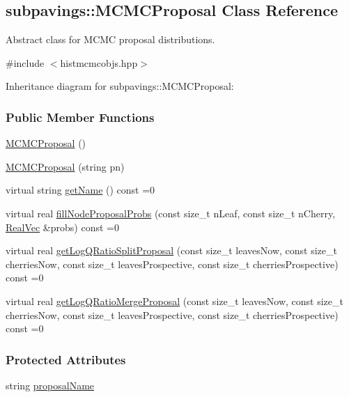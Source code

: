 \hypertarget{classsubpavings_1_1MCMCProposal}{\subsection{subpavings\-:\-:\-M\-C\-M\-C\-Proposal \-Class \-Reference}
\label{classsubpavings_1_1MCMCProposal}
}


\-Abstract class for \-M\-C\-M\-C proposal distributions.  




{\ttfamily \#include $<$histmcmcobjs.\-hpp$>$}



\-Inheritance diagram for subpavings\-:\-:\-M\-C\-M\-C\-Proposal\-:
\subsubsection*{\-Public \-Member \-Functions}
\begin{DoxyCompactItemize}
\item 
\hyperlink{classsubpavings_1_1MCMCProposal_a4ce28643aa42dbdbacbf31cb0b1065b2}{\-M\-C\-M\-C\-Proposal} ()
\item 
\hyperlink{classsubpavings_1_1MCMCProposal_a0ef78a8a1abaa03ed0bb35edd21dd178}{\-M\-C\-M\-C\-Proposal} (string pn)
\item 
virtual string \hyperlink{classsubpavings_1_1MCMCProposal_a8b96ad3e975f60ad938d4aaf6d1009b3}{get\-Name} () const =0
\item 
virtual real \hyperlink{classsubpavings_1_1MCMCProposal_a9a41619f829a7fd3c080f3f9c0bed705}{fill\-Node\-Proposal\-Probs} (const size\-\_\-t n\-Leaf, const size\-\_\-t n\-Cherry, \hyperlink{namespacesubpavings_af2d57bb6e12f4a73169f2e496d6a641f}{\-Real\-Vec} \&probs) const =0
\item 
virtual real \hyperlink{classsubpavings_1_1MCMCProposal_acd6dda5380192dfc3bd38a28925dd1ce}{get\-Log\-Q\-Ratio\-Split\-Proposal} (const size\-\_\-t leaves\-Now, const size\-\_\-t cherries\-Now, const size\-\_\-t leaves\-Prospective, const size\-\_\-t cherries\-Prospective) const =0
\item 
virtual real \hyperlink{classsubpavings_1_1MCMCProposal_ae39f9b3d8afbc8be9a10d6947f59798e}{get\-Log\-Q\-Ratio\-Merge\-Proposal} (const size\-\_\-t leaves\-Now, const size\-\_\-t cherries\-Now, const size\-\_\-t leaves\-Prospective, const size\-\_\-t cherries\-Prospective) const =0
\end{DoxyCompactItemize}
\subsubsection*{\-Protected \-Attributes}
\begin{DoxyCompactItemize}
\item 
string \hyperlink{classsubpavings_1_1MCMCProposal_a9ce4ff476ddf57622979e46888f81c09}{proposal\-Name}
\end{DoxyCompactItemize}


